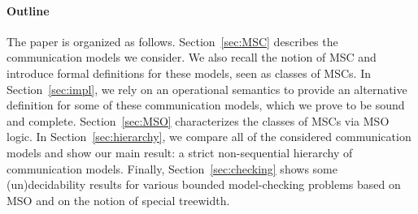 \paragraph{\bf Outline} The paper is organized as follows. Section~\ref{sec:MSC} describes the communication models we consider. We also recall the notion of MSC and introduce formal definitions for these models, seen as classes of MSCs.
In Section~\ref{sec:impl}, we rely on
an operational semantics to provide an alternative definition for some of these communication models, which we prove to be sound and complete.
Section~\ref{sec:MSO} characterizes the classes of MSCs via MSO logic.
In Section~\ref{sec:hierarchy}, we compare all of the considered communication models and show our main result: a strict non-sequential hierarchy of communication models.
Finally, Section~\ref{sec:checking} shows some (un)decidability results for various bounded model-checking
problems based on MSO and on the notion of special treewidth.


